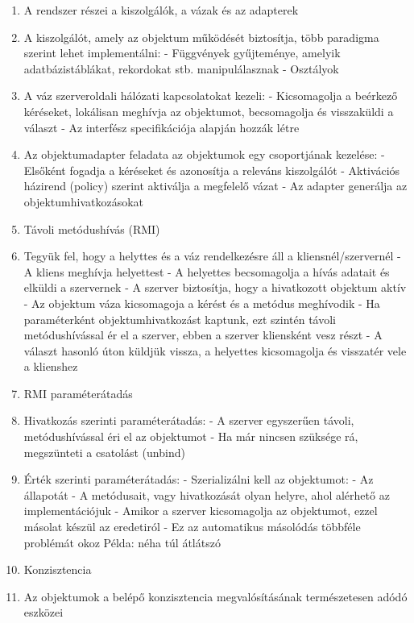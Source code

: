 \documentclass[twoside, a4paper, 12pt]{article}
\begin{document}
\begin{enumerate}
    \item A rendszer részei a kiszolgálók, a vázak és az adapterek
    \item A kiszolgálót, amely az objektum működését biztosítja, több paradigma szerint lehet implementálni:
        - Függvények gyűjteménye, amelyik adatbázistáblákat, rekordokat stb.
        manipulálasznak
        - Osztályok
    \item A váz szerveroldali hálózati kapcsolatokat kezeli:
        - Kicsomagolja a beérkező kéréseket, lokálisan meghívja az objektumot, becsomagolja és visszaküldi a választ
        - Az interfész specifikációja alapján hozzák létre
    \item Az objektumadapter feladata az objektumok egy csoportjának kezelése:
        - Elsőként fogadja a kéréseket és azonosítja a releváns kiszolgálót
        - Aktivációs házirend (policy) szerint aktiválja  a megfelelő vázat
        - Az adapter generálja az objektumhivatkozásokat 
    \item  Távoli metódushívás (RMI)
    \item Tegyük fel, hogy a helyttes és a váz rendelkezésre áll a kliensnél/szervernél
        - A kliens meghívja helyettest
        - A helyettes becsomagolja a hívás adatait és elküldi a szervernek
        - A szerver biztosítja, hogy a hivatkozott objektum aktív
        - Az objektum váza kicsomagoja a kérést és a metódus meghívodik
        - Ha paraméterként objektumhivatkozást kaptunk, ezt szintén távoli metódushívással ér el a szerver,
        ebben a szerver kliensként vesz részt
        - A választ hasonló úton küldjük vissza, a helyettes kicsomagolja és visszatér vele a klienshez
    \item  RMI paraméterátadás
    \item Hivatkozás szerinti paraméterátadás:
        - A szerver egyszerűen távoli, metódushívással éri el az objektumot
        - Ha már nincsen szüksége rá, megszünteti a csatolást (unbind)
    \item Érték szerinti paraméterátadás: 
        - Szerializálni kell az objektumot:
        - Az állapotát
        - A metódusait, vagy hivatkozását olyan helyre, ahol alérhető az implementációjuk
        - Amikor a szerver kicsomagolja az objektumot, ezzel másolat készül az eredetiról
        - Ez az automatikus másolódás többféle problémát okoz Példa: néha túl átlátszó
    \item  Konzisztencia 
    \item Az objektumok a belépő konzisztencia megvalósításának természetesen adódó eszközei

\end{enumerate}
\end{document}
